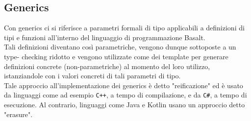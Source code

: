 \subsection{Generics}
Con generics ci si riferisce a parametri formali di tipo applicabili a definizioni di tipi e
funzioni all’interno del linguaggio di programmazione Basalt. \\

Tali definizioni diventano così parametriche, vengono dunque sottoposte a un type-
checking ridotto e vengono utilizzate come dei template per generare definizioni concrete
(non-parametriche) al momento del loro utilizzo, istanziandole con i valori concreti di tali
parametri di tipo. \\

Tale approccio all’implementazione dei generics è detto "reificazione" ed è usato da
linguaggi come ad esempio \texttt{C++}, a tempo di compilazione, e da \texttt{C\#}, a tempo di esecuzione. Al 
contrario, linguaggi come Java e Kotlin usano un approccio detto "erasure".





